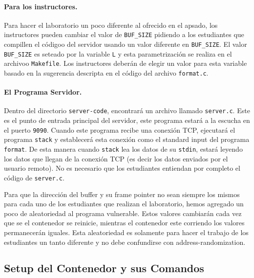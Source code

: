 \paragraph{Para los instructores.} 
Para hacer el laboratorio un poco diferente al ofrecido en el apsado, los instructores pueden cambiar el valor de \texttt{BUF\_SIZE} pidiendo a los estudiantes que compillen el códigoo del servidor usando un valor diferente en \texttt{BUF\_SIZE}.
El valor \texttt{BUF\_SIZE} es seteado por la variable \texttt{L} y esta parametrización se realiza en el archivoo \texttt{Makefile}. Los instructores deberán de elegir un valor para esta variable basado en la sugerencia descripta en el código del archivo \texttt{format.c}.


\paragraph{El Programa Servidor.}
Dentro del directorio \texttt{server-code}, encontrará un archivo llamado \texttt{server.c}.
Este es el punto de entrada principal del servidor, este programa estará a la escucha en el puerto \texttt{9090}. 
Cuando este programa recibe una conexión TCP, ejecutará el programa \texttt{stack} y establecerá esta conexión como el standard input del programa \texttt{format}. De esta manera cuando \texttt{stack} lea los datos de su \texttt{stdin}, estará leyendo los datos que llegan de la conexión TCP (es decir los datos enviados por el usuario remoto). No es necesario que los estudiantes entiendan por completo el código de \texttt{server.c}.

Para que la dirección del buffer y su frame pointer no sean siempre los mismos para cada uno de los estudiantes que realizan el laboratorio, hemos agregado un poco de aleatoriedad al programa vulnerable. Estos valores cambiarán cada vez que se el contenedor se reinicie, mientras el contenedor este corriendo los valores permanecerán iguales. Esta aleatoriedad es solamente para hacer el trabajo de los estudiantes un tanto diferente y no debe confundirse con address-randomization.


\subsection{Setup del Contenedor y sus Comandos}





